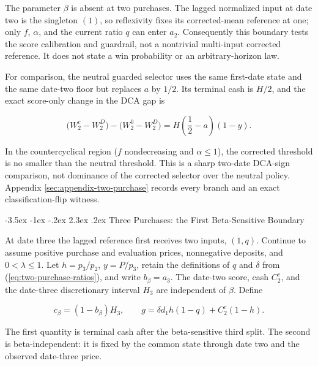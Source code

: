 \documentclass[12pt,a4paper,oneside]{report}
\makeatletter
\renewcommand\section{\@startsection{section}{1}{\z@}%
  {-3.5ex \@plus -1ex \@minus -.2ex}%
  {2.3ex \@plus .2ex}%
  {\normalfont\fontsize{14}{17}\selectfont\bfseries}}
\makeatother
\begin{document}
The parameter $\beta$ is absent at two purchases. The lagged normalized input
at date two is the singleton $(1)$, so reflexivity fixes its corrected-mean
reference at one; only $f$, $\alpha$, and the current ratio $q$ can enter
$a_2$. Consequently this boundary tests the score calibration and guardrail,
not a nontrivial multi-input corrected reference. It does not state a win
probability or an arbitrary-horizon law.

For comparison, the neutral guarded selector uses the same first-date state
and the same date-two floor but replaces $a$ by $1/2$. Its terminal cash is
$H/2$, and the exact score-only change in the DCA gap is

\begin{equation}
  \bigl(W_2^c-W_2^D\bigr)-\bigl(W_2^0-W_2^D\bigr)
  =H\left(\frac12-a\right)(1-y).
  \label{eq:two-purchase-neutral-difference}
\end{equation}

In the countercyclical region ($f$ nondecreasing and $\alpha\leq1$), the
corrected threshold is no smaller than the neutral threshold. This is a sharp
two-date DCA-sign comparison, not dominance of the corrected selector over the
neutral policy. Appendix \ref{sec:appendix-two-purchase} records every branch
and an exact classification-flip witness.

\section{Three Purchases: the First Beta-Sensitive Boundary}
\label{sec:three-purchase}

At date three the lagged reference first receives two inputs, $(1,q)$. Continue
to assume positive purchase and evaluation prices, nonnegative deposits, and
$0<\lambda\leq1$. Let $h=p_3/p_2$, $y=P/p_3$, retain the definitions of $q$
and $\delta$ from (\ref{eq:two-purchase-ratios}), and write $b_\beta=a_3$.
The date-two score,
cash $C_2^c$, and the date-three discretionary interval $H_3$ are independent
of $\beta$. Define

\begin{equation}
  c_\beta=(1-b_\beta)H_3,
  \qquad
  g=\delta d_1h(1-q)+C_2^c(1-h).
  \label{eq:three-purchase-components}
\end{equation}

The first quantity is terminal cash after the beta-sensitive third split. The
second is beta-independent: it is fixed by the common state through date two
and the observed date-three price.
\end{document}
